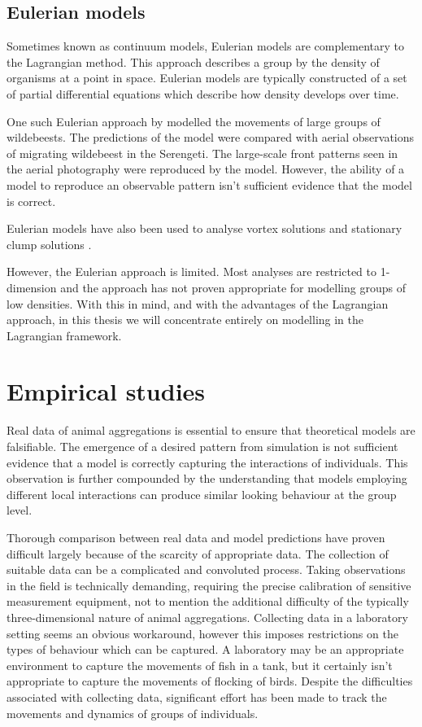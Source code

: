\subsection{Eulerian models}
\label{ssec:eulerian_models}

Sometimes known as continuum models, Eulerian models are complementary to the Lagrangian method. This approach describes a group by the density of organisms at a point in space. Eulerian models are typically constructed of a set of partial differential equations which describe how density develops over time.

One such Eulerian approach by \citet{gueron93} modelled the movements of large groups of wildebeests. The predictions of the model were compared with aerial observations of migrating wildebeest in the Serengeti. The large-scale front patterns seen in the aerial photography were reproduced by the model. However, the ability of a model to reproduce an observable pattern isn't sufficient evidence that the model is correct.

Eulerian models have also been used to analyse vortex solutions \citep{topaz04} and stationary clump solutions \citep{topaz06}.

However, the Eulerian approach is limited. Most analyses are restricted to 1-dimension and the approach has not proven appropriate for modelling groups of low densities. With this in mind, and with the advantages of the Lagrangian approach, in this thesis we will concentrate entirely on modelling in the Lagrangian framework.

\section{Empirical studies}
\label{sec:empirical_studies}

Real data of animal aggregations is essential to ensure that theoretical models are falsifiable. The emergence of a desired pattern from simulation is not sufficient evidence that a model is correctly capturing the interactions of individuals. This observation is further compounded by the understanding that models employing different local interactions can produce similar looking behaviour at the group level.

Thorough comparison between real data and model predictions have proven difficult largely because of the scarcity of appropriate data. The collection of suitable data can be a complicated and convoluted process. Taking observations in the field is technically demanding, requiring the precise calibration of sensitive measurement equipment, not to mention the additional difficulty of the typically three-dimensional nature of animal aggregations. Collecting data in a laboratory setting seems an obvious workaround, however this imposes restrictions on the types of behaviour which can be captured. A laboratory may be an appropriate environment to capture the movements of fish in a tank, but it certainly isn't appropriate to capture the movements of flocking of birds. Despite the difficulties associated with collecting data, significant effort has been made to track the movements and dynamics of groups of individuals.

